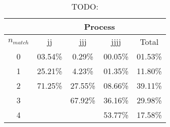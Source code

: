 \begin{table}[!htp]
\centering

\begin{tabular}{|c||c|c|c||c|}
\hline
            &          \multicolumn{4}{c|}{Process} \\
\hline
$n_{match}$ &      jj &    jjj  &    jjjj &   Total \\
\hline\hline 
          0 & 03.54\% &  0.29\% & 00.05\% & 01.53\% \\
          1 & 25.21\% &  4.23\% & 01.35\% & 11.80\% \\
          2 & 71.25\% & 27.55\% & 08.66\% & 39.11\% \\
          3 &         & 67.92\% & 36.16\% & 29.98\% \\
          4 &         &         & 53.77\% & 17.58\% \\
\hline
\end{tabular}
\caption{TODO:}

\end{table}

% 
% 
% 
